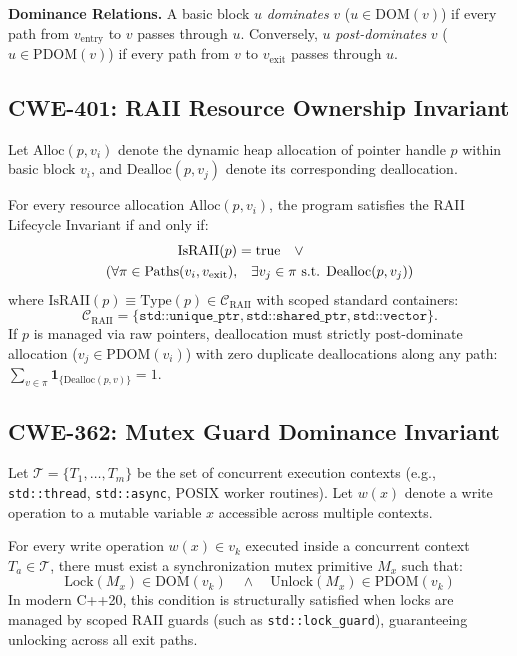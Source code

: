 \documentclass[sigconf,screen,nonacm,pbalance]{acmart}
\begin{document}
\noindent\textbf{Dominance Relations.} A basic block $u$ \emph{dominates} $v$ ($u \in \text{DOM}(v)$) if every path from $v_{\text{entry}}$ to $v$ passes through $u$. Conversely, $u$ \emph{post-dominates} $v$ ($u \in \text{PDOM}(v)$) if every path from $v$ to $v_{\text{exit}}$ passes through $u$.

\subsection{CWE-401: RAII Resource Ownership Invariant}
Let $\text{Alloc}(p, v_i)$ denote the dynamic heap allocation of pointer handle $p$ within basic block $v_i$, and $\text{Dealloc}(p, v_j)$ denote its corresponding deallocation.
\begin{definition}
For every resource allocation $\text{Alloc}(p, v_i)$, the program satisfies the RAII Lifecycle Invariant if and only if:
\begin{align}
    \text{IsRAII}(p) &= \text{true} \quad \lor \notag \\
    (\forall \pi \in \text{Paths}(v_i, v_{\text{exit}}), &\quad \exists v_j \in \pi \text{ s.t. } \text{Dealloc}(p, v_j))
\end{align}
where $\text{IsRAII}(p) \equiv \text{Type}(p) \in \mathcal{C}_{\text{RAII}}$ with scoped standard containers:
\begin{equation*}
    \mathcal{C}_{\text{RAII}} = \{\texttt{std::unique\_ptr}, \texttt{std::shared\_ptr}, \texttt{std::vector}\}.
\end{equation*}
If $p$ is managed via raw pointers, deallocation must strictly post-dominate allocation ($v_j \in \text{PDOM}(v_i)$) with zero duplicate deallocations along any path: $\sum_{v \in \pi} \mathbf{1}_{\{\text{Dealloc}(p, v)\}} = 1$.
\end{definition}

\subsection{CWE-362: Mutex Guard Dominance Invariant}
Let $\mathcal{T} = \{T_1, \dots, T_m\}$ be the set of concurrent execution contexts (e.g., \texttt{std::thread}, \texttt{std::async}, POSIX worker routines). Let $w(x)$ denote a write operation to a mutable variable $x$ accessible across multiple contexts.
\begin{definition}
For every write operation $w(x) \in v_k$ executed inside a concurrent context $T_a \in \mathcal{T}$, there must exist a synchronization mutex primitive $M_x$ such that:
\begin{equation}
    \text{Lock}(M_x) \in \text{DOM}(v_k) \quad \land \quad \text{Unlock}(M_x) \in \text{PDOM}(v_k)
\end{equation}
In modern C++20, this condition is structurally satisfied when locks are managed by scoped RAII guards (such as \lstinline{std::lock_guard}), guaranteeing unlocking across all exit paths.
\end{definition}
\end{document}
